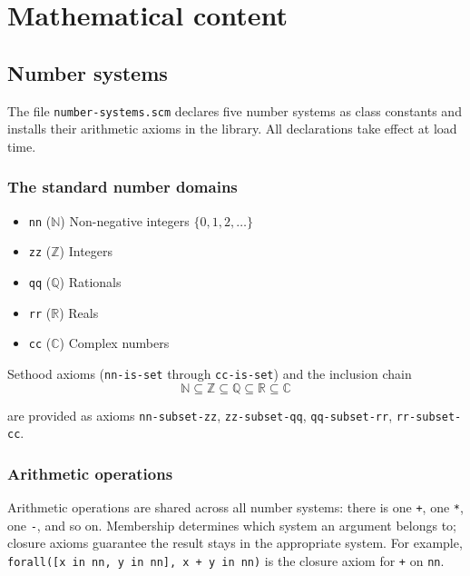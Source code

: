 \chapter{Mathematical content}

\section{Number systems} \label{sec:nums}

The file \texttt{number-systems.scm} declares five number systems as
class constants and installs their arithmetic axioms in the
library.  All declarations take effect at load time.

\subsection{The standard number domains}

\begin{itemize}
\item \texttt{nn} ($\mathbb{N}$) Non-negative integers $\{0, 1, 2, \ldots\}$
\item \texttt{zz} ($\mathbb{Z}$) Integers
\item \texttt{qq} ($\mathbb{Q}$) Rationals
\item \texttt{rr} ($\mathbb{R}$) Reals
\item \texttt{cc} ($\mathbb{C}$) Complex numbers
\end{itemize}

Sethood axioms (\texttt{nn-is-set} through \texttt{cc-is-set}) and the inclusion chain
\[
  \mathbb{N} \subseteq \mathbb{Z} \subseteq \mathbb{Q} \subseteq \mathbb{R} \subseteq \mathbb{C}
\]
\begin{sloppypar}are provided as axioms \texttt{nn-subset-zz}, \texttt{zz-subset-qq},
\texttt{qq-subset-rr}, \texttt{rr-subset-cc}.\end{sloppypar}

\subsection{Arithmetic operations}

Arithmetic operations are shared across all number systems: there is one
\texttt{+}, one \texttt{*}, one \texttt{-}, and so on.  Membership
determines which system an argument belongs to; closure axioms guarantee
the result stays in the appropriate system.  For example,
\texttt{forall([x in nn, y in nn], x + y in nn)} is the
closure axiom for \texttt{+} on \texttt{nn}.

